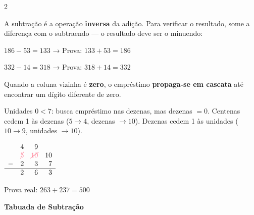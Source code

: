 \documentclass[12pt]{article}
\begin{document}
\begin{multicols}{2}

A subtração é a operação \textbf{inversa} da adição. Para verificar o resultado,
some a diferença com o subtraendo — o resultado deve ser o minuendo:



$186 - 53 = 133$ \;\;→\;\; Prova: $133 + 53 = 186$ \checkmark

$332 - 14 = 318$ \;\;→\;\; Prova: $318 + 14 = 332$ \checkmark


Quando a coluna vizinha é \textbf{zero}, o empréstimo \textbf{propaga-se em cascata}
até encontrar um dígito diferente de zero.


Unidades $0 < 7$: busca empréstimo nas dezenas, mas dezenas $= 0$.
Centenas cedem 1 às dezenas ($5 \to 4$, dezenas $\to 10$).
Dezenas cedem 1 às unidades ($10 \to 9$, unidades $\to 10$).

\vspace{0.4cm}

$\begin{array}{rrrr}
&4&9&\\
&\textcolor{babypink}{\cancel{5}}&\textcolor{babypink}{\cancel{10}}&10\\
-&2&3&7\\
\hline
&2&6&3\\
\end{array}$

\vspace{0.2cm}

Prova real: $263 + 237 = 500$ \checkmark


\end{multicols}

\begin{center}
     \textbf{\Large Tabuada de Subtração}
\end{center}
\end{document}
